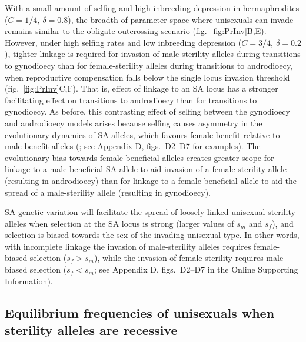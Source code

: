 \documentclass{article}
\begin{document}
With a small amount of selfing and high inbreeding depression in hermaphrodites ($C = 1/4,~\delta = 0.8$), the breadth of parameter space where unisexuals can invade remains similar to the obligate outcrossing scenario (fig.~\ref{fig:PrInv}B,E). However, under high selfing rates and low inbreeding depression ($C = 3/4,~\delta = 0.2$), tighter linkage is required for invasion of male-sterility alleles during transitions to gynodioecy than for female-sterility alleles during transitions to androdioecy, when reproductive compensation falls below the single locus invasion threshold (fig.~\ref{fig:PrInv}C,F). That is, effect of linkage to an SA locus has a stronger facilitating effect on transitions to androdioecy than for transitions to gynodioecy. As before, this contrasting effect of selfing between the gynodioecy and androdioecy models arises because selfing causes asymmetry in the evolutionary dynamics of SA alleles, which favours female-benefit relative to male-benefit alleles (\citealt{ Charlesworth1978a, JordanConnallon2014}; see Appendix D, figs.~D2--D7 for examples). The evolutionary bias towards female-beneficial alleles creates greater scope for linkage to a male-beneficial SA allele to aid invasion of a female-sterility allele (resulting in androdioecy) than for linkage to a female-beneficial allele to aid the spread of a male-sterility allele (resulting in gynodioecy).

SA genetic variation will facilitate the spread of loosely-linked unisexual sterility alleles when selection at the SA locus is strong (larger values of $s_m$ and $s_f$), and selection is biased towards the sex of the invading unisexual type. In other words, with incomplete linkage the invasion of male-sterility alleles requires female-biased selection ($s_f > s_m$), while the invasion of female-sterility requires male-biased selection ($s_f < s_m$; see Appendix D, figs.~D2--D7 in the Online Supporting Information). 

\subsection*{Equilibrium frequencies of unisexuals when sterility alleles are recessive}
\end{document}
